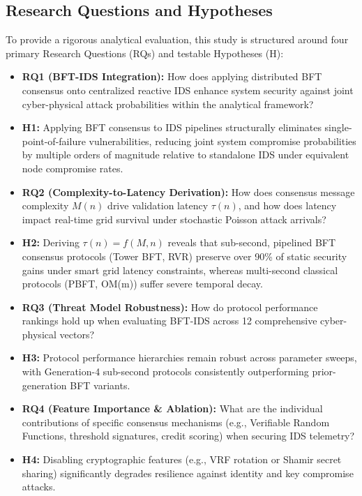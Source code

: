 \documentclass[10pt,twocolumn,journal]{IEEEtran}
\begin{document}
\subsection{Research Questions and Hypotheses}
To provide a rigorous analytical evaluation, this study is structured around four primary Research Questions (RQs) and testable Hypotheses (H):

\begin{itemize}[leftmargin=*]
    \item \textbf{RQ1 (BFT-IDS Integration):} How does applying distributed BFT consensus onto centralized reactive IDS enhance system security against joint cyber-physical attack probabilities within the analytical framework?
    \item \textbf{H1:} Applying BFT consensus to IDS pipelines structurally eliminates single-point-of-failure vulnerabilities, reducing joint system compromise probabilities by multiple orders of magnitude relative to standalone IDS under equivalent node compromise rates.
    \item \textbf{RQ2 (Complexity-to-Latency Derivation):} How does consensus message complexity $M(n)$ drive validation latency $\tau(n)$, and how does latency impact real-time grid survival under stochastic Poisson attack arrivals?
    \item \textbf{H2:} Deriving $\tau(n) = f(M, n)$ reveals that sub-second, pipelined BFT consensus protocols (Tower BFT, RVR) preserve over 90\% of static security gains under smart grid latency constraints, whereas multi-second classical protocols (PBFT, OM(m)) suffer severe temporal decay.
    \item \textbf{RQ3 (Threat Model Robustness):} How do protocol performance rankings hold up when evaluating BFT-IDS across 12 comprehensive cyber-physical vectors?
    \item \textbf{H3:} Protocol performance hierarchies remain robust across parameter sweeps, with Generation-4 sub-second protocols consistently outperforming prior-generation BFT variants.
    \item \textbf{RQ4 (Feature Importance & Ablation):} What are the individual contributions of specific consensus mechanisms (e.g., Verifiable Random Functions, threshold signatures, credit scoring) when securing IDS telemetry?
    \item \textbf{H4:} Disabling cryptographic features (e.g., VRF rotation or Shamir secret sharing) significantly degrades resilience against identity and key compromise attacks.
\end{itemize}
\end{document}
